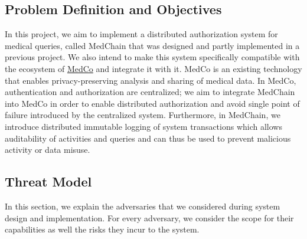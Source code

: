 \subsection{Problem Definition and Objectives}

In this project, we aim to implement a distributed authorization system for medical queries, called MedChain that was designed and partly implemented in a previous project. We also intend to make this system specifically compatible with the ecosystem of \href{https://medco.epfl.ch/}{MedCo} and integrate it with it. MedCo is an existing technology that enables privacy-preserving analysis and sharing of medical data. In MedCo, authentication and authorization are centralized; we aim to integrate MedChain into MedCo in order to enable distributed authorization and avoid single point of failure introduced by the centralized system. Furthermore, in MedChain, we introduce distributed immutable logging of system transactions which allows auditability of activities and queries and can thus be used to prevent malicious activity or data misuse. 





\subsection{Threat Model}
In this section, we explain the adversaries that we considered during system design and implementation. For every adversary, we consider the scope for their capabilities as well the risks they incur to the system.

